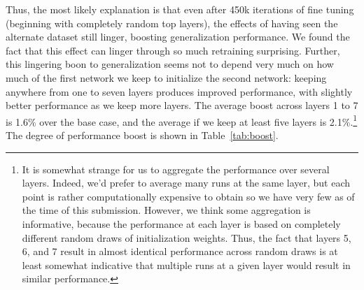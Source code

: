 \begin{enumerate}
Thus, the most likely explanation is that even after 450k iterations of fine tuning (beginning with completely random top layers), the effects of having seen the alternate dataset still linger, boosting generalization performance. We found the fact that this effect can linger through so much retraining surprising. Further, this lingering boon to generalization seems not to depend very much on how much of the first network we keep to initialize the second network: keeping anywhere from one to seven layers produces improved performance, with slightly better performance as we keep more layers. The average boost across layers 1 to 7 is 1.6\% over the base case, and the average if we keep at least five layers is 2.1\%.\footnote{It is somewhat strange for us to aggregate the performance over several layers. Indeed, we'd prefer to average many runs at the same layer, but each point is rather computationally expensive to obtain so we have very few as of the time of this submission. However, we think some aggregation is informative, because the performance at each layer is based on completely different random draws of initialization weights. Thus, the fact that layers 5, 6, and 7 result in almost identical performance across random draws is at least somewhat indicative that multiple runs at a given layer would result in similar performance.} The degree of performance boost is shown in Table~\ref{tab:boost}.

\end{enumerate}

%
% 
% 
% 


